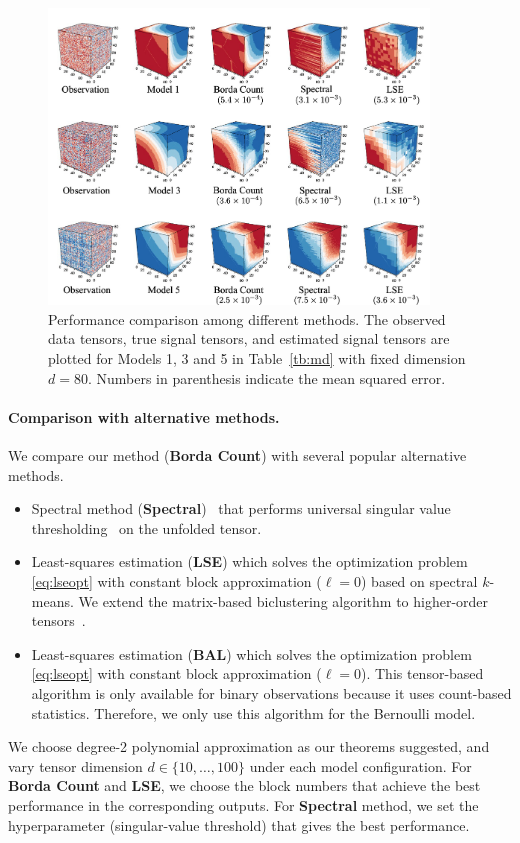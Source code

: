 \documentclass[11pt]{article}
\theoremstyle{definition}
\begin{document}
\begin{figure}[ht]
    \centering
    \includegraphics[width =0.9\textwidth]{figure/vfinal.pdf}
    \caption{Performance comparison among different methods. The observed data tensors, true signal tensors, and estimated signal tensors are plotted for Models 1, 3 and 5 in Table~\ref{tb:md} with fixed dimension $d = 80$. Numbers in parenthesis indicate the mean squared error.}
    \label{fig:contim}
\end{figure}


\paragraph{Comparison with alternative methods.} We compare our method ({\bf \small Borda Count}) with several popular alternative methods. 
\begin{itemize}[wide, labelwidth=0pt, labelindent=0pt,itemsep=0ex]
    \item  Spectral method ({\bf \small Spectral})~\citep{xu2018rates} that performs universal singular value thresholding~\citep{chatterjee2015matrix} on the unfolded tensor.
    \item Least-squares estimation ({\bf \small LSE}) \citep{gao2015rate} which solves the optimization problem \eqref{eq:lseopt} with constant block approximation ($\ell=0$) based on spectral $k$-means. We extend the matrix-based biclustering algorithm to higher-order tensors~\citep{han2020exact}. 
    \item Least-squares estimation ({\bf \small BAL}) \citep{balasubramanian2021nonparametric} which solves the optimization problem \eqref{eq:lseopt} with constant block approximation ($\ell=0$). This tensor-based algorithm is only available for binary observations because it uses count-based statistics. Therefore, we only use this algorithm for the Bernoulli model.
\end{itemize}
We choose degree-2 polynomial approximation as our theorems suggested, and vary tensor dimension $d\in\{10,\ldots,100\}$ under each model configuration. For {\bf \small Borda Count} and {\bf \small LSE}, we choose the block numbers that achieve the best performance in the corresponding outputs. For {\bf \small Spectral} method, we set the hyperparameter (singular-value threshold) that gives the best performance. 
\end{document}
